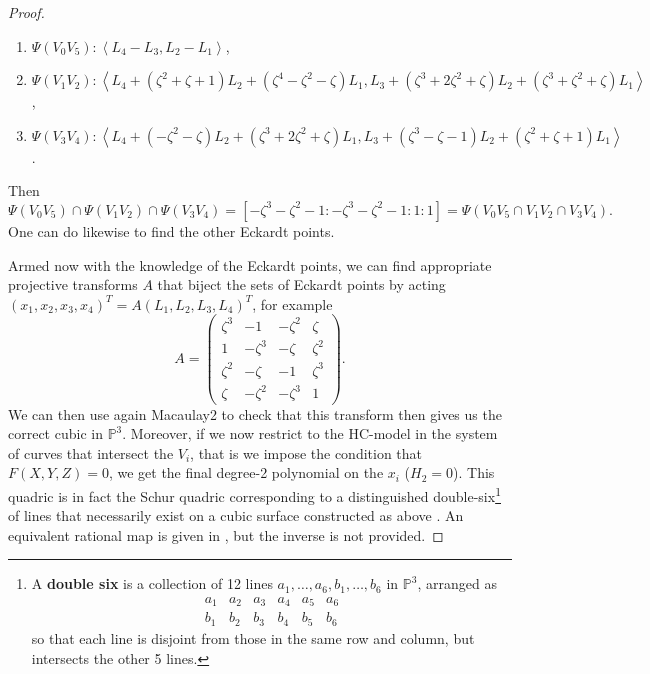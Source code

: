 \documentclass{amsart}
\newcommand{\pangle}[1]{\left\langle #1 \right\rangle}
\begin{document}
\begin{proof}
\begin{enumerate}
    \item $\Psi(V_0 V_5) : \pangle{L_4 - L_3, L_2 - L_1}$, 
    \item $\Psi(V_1 V_2) : \pangle{L_4 + (\zeta^2 + \zeta+1 )L_2 + (\zeta^4 - \zeta^2 - \zeta)L_1,  L_3 + (\zeta^3+ 2 \zeta^2 + \zeta)L_2 + (\zeta^3 + \zeta^2 + \zeta) L_1}$,
    \item $\Psi(V_3 V_4) : \pangle{L_4 + (-\zeta^2 - \zeta)L_2 + (\zeta^3 + 2\zeta^2 + \zeta)L_1,  L_3 + (\zeta^3 - \zeta - 1)L_2 + (\zeta^2 + \zeta + 1)L_1}$.
\end{enumerate}
Then
\[
\Psi(V_0 V_5) \cap \Psi(V_1 V_2) \cap \Psi(V_3 V_4) = [-\zeta^3 - \zeta^2 - 1 : -\zeta^3 - \zeta^2 - 1 : 1 : 1] = \Psi(V_0 V_5 \cap V_1 V_2 \cap V_3 V_4)  . 
\]
One can do likewise to find the other Eckardt points. 

Armed now with the knowledge of the Eckardt points, we can find appropriate projective transforms $A$ that biject the sets of Eckardt points by acting $(x_1, x_2, x_3, x_4)^T = A(L_1, L_2, L_3, L_4)^T$, for example 
\[
A = \begin{pmatrix}
\zeta^3 & -1 & -\zeta^{2} & \zeta \\ 1 & -\zeta^3 & -\zeta & \zeta^{2} \\ \zeta^{2} & -\zeta & -1 & \zeta^3 \\ \zeta & -\zeta^2 & -\zeta^3 & 1 \end{pmatrix} . 
\]
We can then use again Macaulay2 to check that this transform then gives us the correct cubic in $\mathbb{P}^3$. Moreover, if we now restrict to the HC-model in the system of curves that intersect the $V_i$, that is we impose the condition that $F(X, Y, Z)=0$, we get the final degree-2 polynomial on the $x_i$ ($H_2=0$). This quadric is in fact the Schur quadric corresponding to a distinguished double-six\footnote{A \textbf{double six} is a collection of 12 lines $a_1, \dots, a_6, b_1, \dots, b_6$ in $\mathbb{P}^3$, arranged as 
\[
\begin{array}{cccccc}
    a_1 & a_2 & a_3 & a_4 & a_5 & a_6  \\
    b_1 & b_2 & b_3 & b_4 & b_5 & b_6 
\end{array}
\]
so that each line is disjoint from those in the same row and column, but intersects the other 5 lines.} of lines that necessarily exist on a cubic surface constructed as above \cite{Dye1995}. An equivalent rational map is given in \cite[p. 557]{Dolgachev2012}, but the inverse is not provided.



\end{proof}
\end{document}
